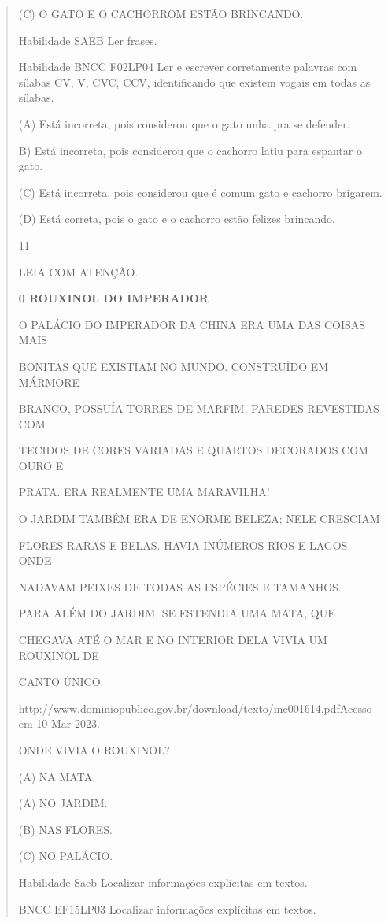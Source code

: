 \begin{verse}
{{{{{{{{{{{{{{{{{{{{(C) O GATO E O CACHORROM ESTÃO BRINCANDO.

\protect\hypertarget{_Hlk129376594}{}{}Habilidade SAEB Ler frases.

Habilidade BNCC F02LP04 Ler e escrever corretamente palavras com sílabas
CV, V, CVC, CCV, identificando que existem vogais em todas as sílabas.

(A) Está incorreta, pois considerou que o gato unha pra se defender.

B) Está incorreta, pois considerou que o cachorro latiu para espantar o
gato.

(C) Está incorreta, pois considerou que é comum gato e cachorro
brigarem.

(D) Está correta, pois o gato e o cachorro estão felizes brincando.

\num{11}

LEIA COM ATENÇÃO.

\textbf{0 ROUXINOL DO IMPERADOR}

O PALÁCIO DO IMPERADOR DA CHINA ERA UMA DAS COISAS MAIS

BONITAS QUE EXISTIAM NO MUNDO. CONSTRUÍDO EM MÁRMORE

BRANCO, POSSUÍA TORRES DE MARFIM, PAREDES REVESTIDAS COM

TECIDOS DE CORES VARIADAS E QUARTOS DECORADOS COM OURO E

PRATA. ERA REALMENTE UMA MARAVILHA!

O JARDIM TAMBÉM ERA DE ENORME BELEZA; NELE CRESCIAM

FLORES RARAS E BELAS. HAVIA INÚMEROS RIOS E LAGOS, ONDE

NADAVAM PEIXES DE TODAS AS ESPÉCIES E TAMANHOS.

PARA ALÉM DO JARDIM, SE ESTENDIA UMA MATA, QUE

CHEGAVA ATÉ O MAR E NO INTERIOR DELA VIVIA UM ROUXINOL DE

CANTO ÚNICO.

http://www.dominiopublico.gov.br/download/texto/me001614.pdfAcesso em 10
Mar 2023.

ONDE VIVIA O ROUXINOL?

(A) NA MATA.

(A) NO JARDIM.

(B) NAS FLORES.

(C) NO PALÁCIO.

Habilidade Saeb Localizar informações explícitas em textos.

BNCC EF15LP03 Localizar informações explícitas em textos.

}}}}}}}}}}}}}}}}}}}}
\end{verse}
